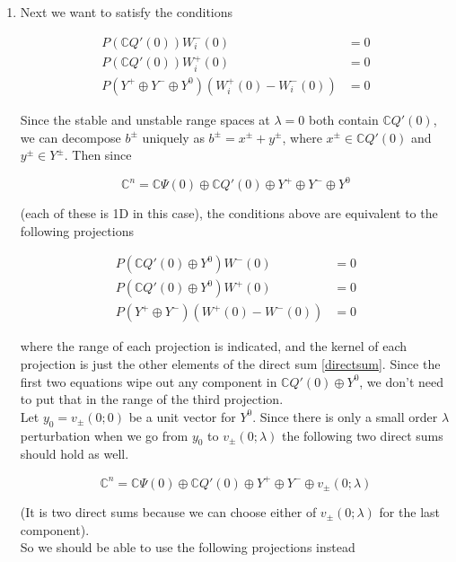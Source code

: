 \documentclass[12pt]{article}
\def\C{{\mathbb C}}
\begin{document}
\begin{enumerate}
	
\item Next we want to satisfy the conditions

\begin{align*}
P(\C Q'(0))W_i^-(0) &= 0 \\
P(\C Q'(0))W_i^+(0) &= 0 \\
P(Y^+ \oplus Y^- \oplus Y^0) ( W_i^+(0) - W_i^-(0) ) &= 0
\end{align*}

Since the stable and unstable range spaces at $\lambda = 0$ both contain $\C Q'(0)$, we can decompose $b^\pm$ uniquely as $b^\pm = x^\pm + y^\pm$, where $x^\pm \in \C Q'(0)$ and $y^\pm \in Y^\pm$. Then since

\begin{equation}\label{directsum}
\C^n = \C\Psi(0) \oplus \C Q'(0) \oplus Y^+ \oplus Y^- \oplus Y^0
\end{equation}

(each of these is 1D in this case), the conditions above are equivalent to the following projections

\begin{align*}
P(\C Q'(0) \oplus Y^0 )W^-(0) &= 0 \\
P(\C Q'(0) \oplus Y^0 )W^+(0) &= 0 \\
P(Y^+ \oplus Y^-) (W^+(0) - W^-(0) ) &= 0
\end{align*}

where the range of each projection is indicated, and the kernel of each projection is just the other elements of the direct sum \eqref{directsum}. Since the first two equations wipe out any component in $\C Q'(0) \oplus Y^0$, we don't need to put that in the range of the third projection. \\

Let $y_0 = v_\pm(0; 0)$ be a unit vector for $Y^0$. Since there is only a small order $\lambda$ perturbation when we go from $y_0$ to $v_\pm(0; \lambda)$ the following two direct sums should hold as well.

\begin{equation}\label{directsum2}
\C^n = \C\Psi(0) \oplus \C Q'(0) \oplus Y^+ \oplus Y^- \oplus v_\pm(0; \lambda)
\end{equation}

(It is two direct sums because we can choose either of $v_\pm(0; \lambda)$ for the last component).\\

So we should be able to use the following projections instead


\end{enumerate}
\end{document}
